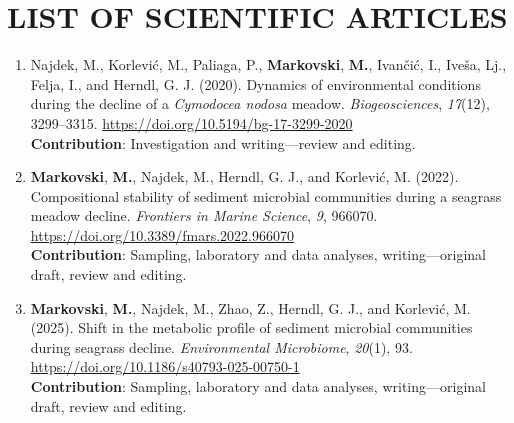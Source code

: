 \documentclass[
  12 pt,
]{book}
\begin{document}

\vspace*{0pt}


\hypertarget{scientific-articles-list}{%
\section*{LIST OF SCIENTIFIC ARTICLES}\label{scientific-articles-list}}

\begin{enumerate}
\def\labelenumi{\arabic{enumi}.}
\item
  Najdek, M., Korlević, M., Paliaga, P., \textbf{Markovski}, \textbf{M.}, Ivančić, I., Iveša, Lj., Felja, I., and Herndl, G. J. (2020). Dynamics of environmental conditions during the decline of a \emph{Cymodocea nodosa} meadow. \emph{Biogeosciences}, \emph{17}(12), 3299--3315. \url{https://doi.org/10.5194/bg-17-3299-2020}\\
  \textbf{Contribution}: Investigation and writing---review and editing.
  \bigskip
\item
  \textbf{Markovski}, \textbf{M.}, Najdek, M., Herndl, G. J., and Korlević, M. (2022). Compositional stability of sediment microbial communities during a seagrass meadow decline. \emph{Frontiers in Marine Science}, \emph{9}, 966070. \url{https://doi.org/10.3389/fmars.2022.966070}\\
  \textbf{Contribution}: Sampling, laboratory and data analyses, writing---original draft, review and editing.
  \bigskip
\item
  \textbf{Markovski}, \textbf{M.}, Najdek, M., Zhao, Z., Herndl, G. J., and Korlević, M. (2025). Shift in the metabolic profile of sediment microbial communities during seagrass decline. \emph{Environmental Microbiome}, \emph{20}(1), 93. \url{https://doi.org/10.1186/s40793-025-00750-1}\\
  \textbf{Contribution}: Sampling, laboratory and data analyses, writing---original draft, review and editing.
\end{enumerate}

\clearpage

\end{document}

